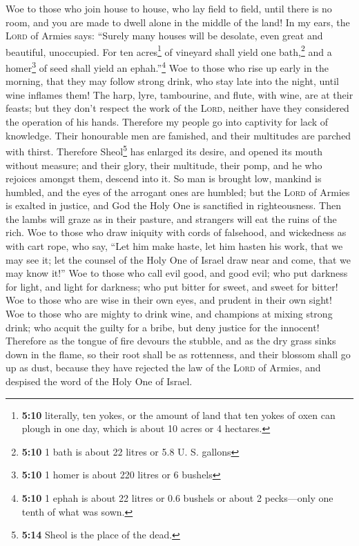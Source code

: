  Woe to those who join house to house, who lay field to
field, until there is no room, and you are made to dwell alone in the
middle of the land!  In my ears, the \textsc{Lord} of
Armies says: ``Surely many houses will be desolate, even great and
beautiful, unoccupied.  For ten acres\footnote{\textbf{5:10}
  literally, ten yokes, or the amount of land that ten yokes of oxen can
  plough in one day, which is about 10 acres or 4 hectares.} of vineyard
shall yield one bath,\footnote{\textbf{5:10} 1 bath is about 22 litres
  or 5.8 U. S. gallons} and a homer\footnote{\textbf{5:10} 1 homer is
  about 220 litres or 6 bushels} of seed shall yield an
ephah.''\footnote{\textbf{5:10} 1 ephah is about 22 litres or 0.6
  bushels or about 2 pecks---only one tenth of what was sown.}
 Woe to those who rise up early in the morning, that they
may follow strong drink, who stay late into the night, until wine
inflames them!  The harp, lyre, tambourine, and flute,
with wine, are at their feasts; but they don't respect the work of the
\textsc{Lord}, neither have they considered the operation of his hands.
 Therefore my people go into captivity for lack of
knowledge. Their honourable men are famished, and their multitudes are
parched with thirst.  Therefore Sheol\footnote{\textbf{5:14}
  Sheol is the place of the dead.} has enlarged its desire, and opened
its mouth without measure; and their glory, their multitude, their pomp,
and he who rejoices amongst them, descend into it.  So
man is brought low, mankind is humbled, and the eyes of the arrogant
ones are humbled;  but the \textsc{Lord} of Armies is
exalted in justice, and God the Holy One is sanctified in righteousness.
 Then the lambs will graze as in their pasture, and
strangers will eat the ruins of the rich.  Woe to those
who draw iniquity with cords of falsehood, and wickedness as with cart
rope,  who say, ``Let him make haste, let him hasten his
work, that we may see it; let the counsel of the Holy One of Israel draw
near and come, that we may know it!''  Woe to those who
call evil good, and good evil; who put darkness for light, and light for
darkness; who put bitter for sweet, and sweet for bitter!
 Woe to those who are wise in their own eyes, and prudent
in their own sight!  Woe to those who are mighty to drink
wine, and champions at mixing strong drink;  who acquit
the guilty for a bribe, but deny justice for the innocent!
 Therefore as the tongue of fire devours the stubble, and
as the dry grass sinks down in the flame, so their root shall be as
rottenness, and their blossom shall go up as dust, because they have
rejected the law of the \textsc{Lord} of Armies, and despised the word
of the Holy One of Israel.

